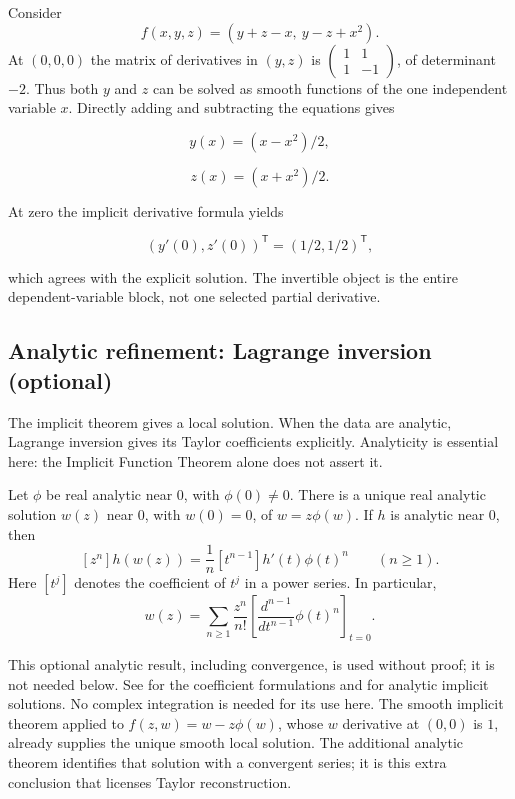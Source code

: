 \begin{example}
Consider
\[
f(x,y,z)=(y+z-x,\ y-z+x^2).
\]
At $(0,0,0)$ the matrix of derivatives in $(y,z)$ is
$\left(\begin{matrix}1&1\\1&-1\end{matrix}\right)$,
of determinant $-2$. Thus both $y$ and $z$ can be solved as smooth
functions of the one independent variable $x$. Directly adding and
subtracting the equations gives

\[
y(x)=(x-x^2)/2,
\]

\[
z(x)=(x+x^2)/2.
\]

At zero the implicit derivative formula yields

\[
(y'(0),z'(0))^{\mathsf T}=(1/2,1/2)^{\mathsf T},
\]

which agrees with the explicit solution. The invertible object is the
entire dependent-variable block, not one selected partial derivative.
\end{example}
\begin{center}
\end{center}
\subsection{Analytic refinement: Lagrange inversion (optional)}
The implicit theorem gives a local solution. When the data are analytic,
Lagrange inversion gives its Taylor coefficients explicitly. Analyticity
is essential here: the Implicit Function Theorem alone does not assert it.

\begin{theorem}\label{thm:lagrange-inversion}
Let $\phi$ be real analytic near $0$, with $\phi(0)\ne0$. There is a
unique real analytic solution $w(z)$ near $0$, with $w(0)=0$, of
$w=z\phi(w)$. If $h$ is analytic near $0$, then
\[
[z^n]h(w(z))=\frac1n[t^{n-1}]h'(t)\phi(t)^n\qquad(n\geq1).
\]
Here $[t^j]$ denotes the coefficient of $t^j$ in a power series. In particular,
\[
w(z)=\sum_{n\geq1}\frac{z^n}{n!}
 \left[\frac{d^{n-1}}{dt^{n-1}}\phi(t)^n\right]_{t=0}.
\]
\end{theorem}
This optional analytic result, including convergence, is used without proof;
it is not needed below. See \cite[\S2.1 and \S2.6]{gessel-lagrange}
for the coefficient formulations and \cite{sokal-implicit} for analytic
implicit solutions. No complex integration is needed for its use here.
The smooth implicit theorem applied to $f(z,w)=w-z\phi(w)$, whose
$w$ derivative at $(0,0)$ is $1$, already supplies the unique smooth local
solution. The additional analytic theorem identifies that solution with
a convergent series; it is this extra conclusion that licenses Taylor
reconstruction.

